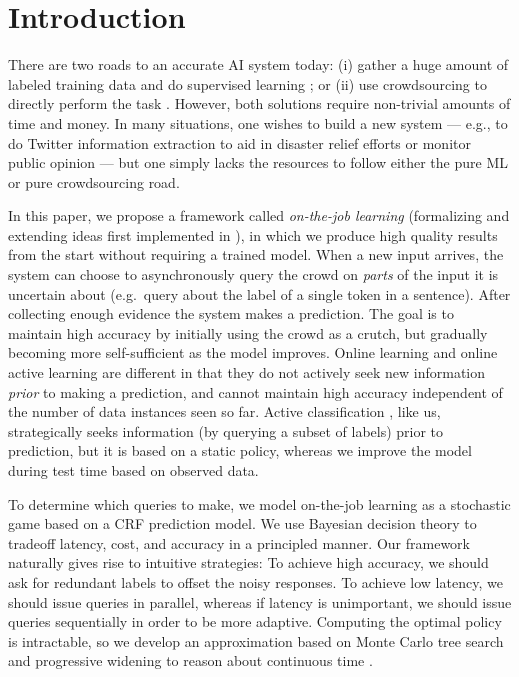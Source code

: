 \section{Introduction}
\label{sec:intro}

There are two roads to an accurate AI system today:
(i) gather a huge amount of labeled training data \citep{deng2009imagenet} and do supervised learning \citep{krizhevsky2012imagenet};
or (ii) use crowdsourcing to directly perform the task \citep{bernstein2010soylent,kokkalis2013emailvalet}.
However, both solutions require non-trivial amounts of time and money.
In many situations, one wishes to build a new system --- e.g., to do Twitter information extraction
\citep{li2012twiner} to aid in disaster relief efforts or monitor public
opinion --- but one simply lacks the resources to follow either the pure ML or pure crowdsourcing road.

In this paper, we propose a framework called \emph{on-the-job learning} (formalizing and extending ideas first implemented in \citep{lasecki2013realtime}),
in which we produce high quality results from the start without requiring a trained model.
When a new input arrives,
the system can choose to asynchronously query the crowd on \emph{parts} of the input it is
uncertain about (e.g.\ query about the label of a single token in a sentence). After collecting enough evidence the system makes a prediction.
The goal is to maintain high accuracy by initially using the crowd as a crutch,
but gradually becoming more self-sufficient as the model improves.
Online learning \citep{cesabianchi06prediction} and
online active learning \citep{helmbold1997some,sculley2007online,chu2011unbiased}
are different in that
they do not actively seek new information \emph{prior} to making a prediction,
and cannot maintain high accuracy independent of the number of data instances seen so far.
Active classification \citep{gao2011active}, like us,
strategically seeks information (by querying a subset of labels) prior to prediction,
but it is based on a static policy, 
whereas we improve the model during test time based on observed data.

To determine which queries to make,
we model on-the-job learning as a stochastic game based on a CRF prediction model.
We use Bayesian decision theory to tradeoff latency, cost, and accuracy in a principled manner.
Our framework naturally gives rise to intuitive strategies:
To achieve high accuracy, we should ask for redundant labels
to offset the noisy responses.  To achieve low latency, we should issue queries
in parallel, whereas if latency is unimportant, we should issue queries
sequentially in order to be more adaptive.
Computing the optimal policy is intractable,
so we develop an approximation
based on Monte Carlo tree search \citep{kocsis2006bandit} and
progressive widening to reason about continuous time \citep{coulom2007computing}.

